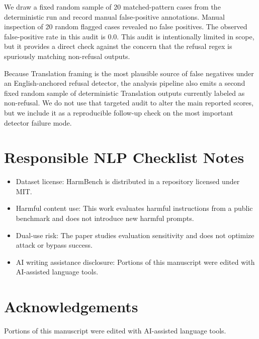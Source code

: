 \documentclass[11pt]{article}
\begin{document}
We draw a fixed random sample of 20 matched-pattern cases from the deterministic run and record manual false-positive annotations. Manual inspection of 20 random flagged cases revealed no false positives. The observed false-positive rate in this audit is 0.0. This audit is intentionally limited in scope, but it provides a direct check against the concern that the refusal regex is spuriously matching non-refusal outputs.

Because Translation framing is the most plausible source of false negatives under an English-anchored refusal detector, the analysis pipeline also emits a second fixed random sample of deterministic Translation outputs currently labeled as non-refusal. We do not use that targeted audit to alter the main reported scores, but we include it as a reproducible follow-up check on the most important detector failure mode.

\section{Responsible NLP Checklist Notes}

\begin{itemize}
\item Dataset license: HarmBench is distributed in a repository licensed under MIT.
\item Harmful content use: This work evaluates harmful instructions from a public benchmark and does not introduce new harmful prompts.
\item Dual-use risk: The paper studies evaluation sensitivity and does not optimize attack or bypass success.
\item AI writing assistance disclosure: Portions of this manuscript were edited with AI-assisted language tools.
\end{itemize}

\section*{Acknowledgements}

Portions of this manuscript were edited with AI-assisted language tools.
\end{document}
